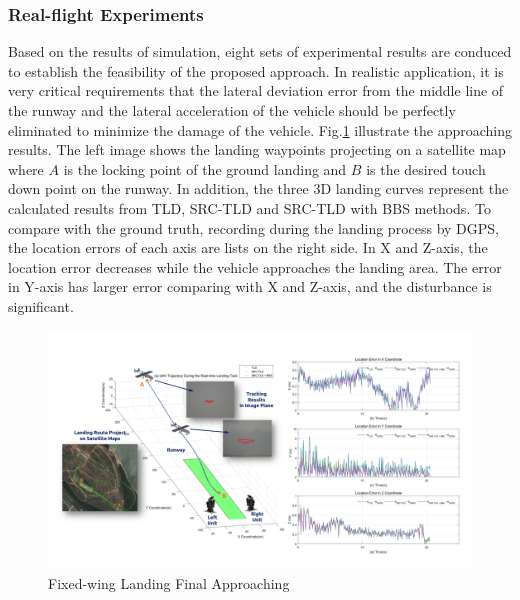 \subsubsection{Real-flight Experiments}
Based on the results of simulation, eight sets of experimental results are conduced to establish the feasibility of the proposed approach. In realistic application, it is very critical requirements that the lateral deviation error from the middle line of the runway and the lateral acceleration of the vehicle should be perfectly eliminated to minimize the damage of the vehicle. Fig.\ref{fig:sci02_landing_results_big} illustrate the approaching results. The left image shows the landing waypoints projecting on a satellite map where $A$ is the locking point of the ground landing and $B$ is the desired touch down point on the runway. In addition, the three 3D landing curves represent the calculated results from TLD, SRC-TLD and SRC-TLD with BBS methods. To compare with the ground truth, recording during the landing process by DGPS, the location errors of each axis are lists on the right side. In X and Z-axis, the location error decreases while the vehicle approaches the landing area. The error in Y-axis has larger error comparing with X and Z-axis, and the disturbance is significant.

\begin{figure}[!th]
	\centering
	\includegraphics[width=\textwidth]{Figs/sci02_landing_results_big.pdf}	
	\caption{Fixed-wing Landing Final Approaching}
	\label{fig:sci02_landing_results_big}
\end{figure}


